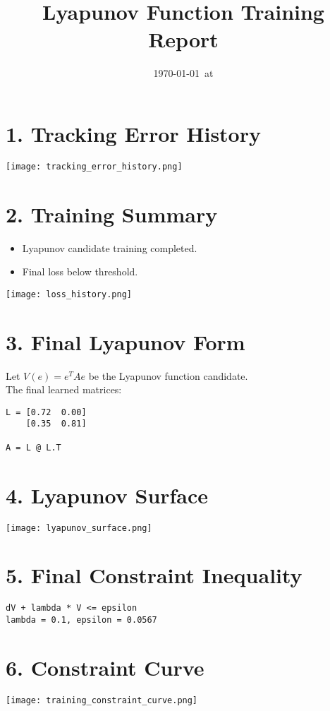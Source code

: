 \documentclass[11pt]{article}
\title{Lyapunov Function Training Report}
\author{}
\date{\today\ at \currenttime}
\begin{document}
\maketitle

\section*{1. Tracking Error History}
\texttt{[image: tracking\_error\_history.png]}

\section*{2. Training Summary}
\begin{itemize}
  \item Lyapunov candidate training completed.
  \item Final loss below threshold.
\end{itemize}
\texttt{[image: loss\_history.png]}

\section*{3. Final Lyapunov Form}
Let $V(e) = e^T A e$ be the Lyapunov function candidate. \\
The final learned matrices:
\begin{verbatim}
L = [0.72  0.00]
    [0.35  0.81]

A = L @ L.T
\end{verbatim}

\section*{4. Lyapunov Surface}
\texttt{[image: lyapunov\_surface.png]}

\section*{5. Final Constraint Inequality}
\begin{verbatim}
dV + lambda * V <= epsilon
lambda = 0.1, epsilon = 0.0567
\end{verbatim}

\section*{6. Constraint Curve}
\texttt{[image: training\_constraint\_curve.png]}
\end{document}
